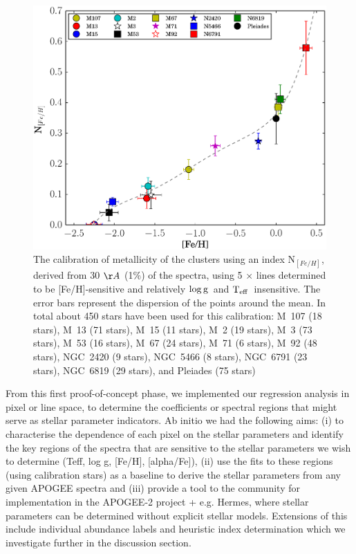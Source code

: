 \documentclass[12pt, preprint]{aastex}
\newcommand{\teff}{\mbox{$\rm T_{eff}$}}
\newcommand{\logg}{\mbox{$\rm \log g$}}
\begin{document}
\begin{figure}[h!]
  \includegraphics[width=\hsize]{./plots/metals_index.eps}
\caption{The calibration of metallicity of the clusters using an index N$_{[Fe/H]}$, derived from 30 $\AA$ (1\%) of the spectra, using 5 $\times$ lines determined to be [Fe/H]-sensitive and relatively \logg\ and \teff\ insensitive. The error bars represent the dispersion of the points
  around the mean. In total about 450  stars have been used for this
  calibration: M~107 (18 stars), M~13 (71 stars), M~15 (11 stars), M~2
  (19 stars), M~3 (73 stars), M~53 (16 stars), M~67 (24 stars), M~71
  (6 stars), M~92 (48 stars), NGC~2420 (9 stars), NGC~5466 (8 stars),
  NGC~6791 (23 stars), NGC~6819 (29 stars), and Pleiades (75 stars) }%
\label{fig:index}
\end{figure}


From this first proof-of-concept phase, we implemented our regression analysis in pixel or line space, to determine the coefficients or spectral regions that might serve as stellar parameter indicators.  Ab initio we had the following aims: (i) to characterise the dependence of each pixel on the stellar parameters and identify the key regions of the spectra that are sensitive to the stellar parameters we wish to determine (Teff, log g, [Fe/H], [alpha/Fe]), (ii) use the fits to these regions (using calibration stars) as a baseline to derive the stellar parameters from any given APOGEE spectra and (iii) provide a tool to the community for implementation in the APOGEE-2 project + e.g. Hermes, where stellar parameters can be determined without explicit stellar models. Extensions of this include individual abundance labels and heuristic index determination which we investigate further in the discussion section.
\end{document}
